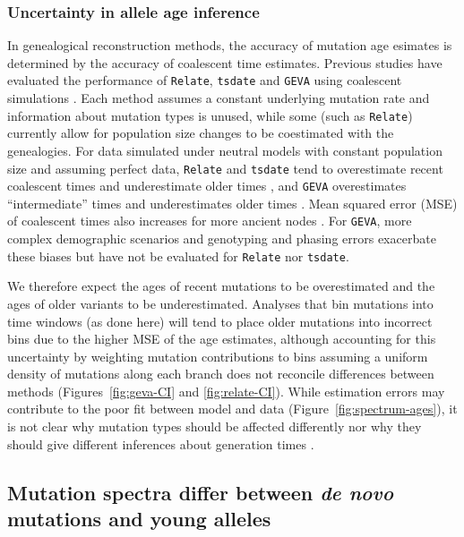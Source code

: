 \documentclass[]{article}
\newcommand{\GEVA}{\texttt{GEVA}\xspace}
\newcommand{\tsdate}{\texttt{tsdate}\xspace}
\newcommand{\relate}{\texttt{Relate}\xspace}
\begin{document}
\subsubsection*{Uncertainty in allele age inference}

In genealogical reconstruction methods, the accuracy of mutation age esimates
is determined by the accuracy of coalescent time estimates. Previous studies
have evaluated the performance of \relate, \tsdate and \GEVA using coalescent
simulations \citep{brandt2022evaluation,albers2020dating}. Each method assumes
a constant underlying mutation rate and information about mutation types is
unused, while some (such as \relate) currently allow for population size
changes to be coestimated with the genealogies. For data simulated under
neutral models with constant population size and assuming perfect data, \relate
and \tsdate tend to overestimate recent coalescent times and underestimate
older times \citep{brandt2022evaluation}, and \GEVA overestimates
``intermediate'' times and underestimates older times \citep{albers2020dating}.
Mean squared error (MSE) of coalescent times also increases for more ancient
nodes \citep{brandt2022evaluation}. For \GEVA, more complex demographic scenarios
 and genotyping and phasing errors exacerbate these biases \cite{albers2020dating}
but have not be evaluated for \relate nor \tsdate.

We therefore expect the ages of recent mutations to be overestimated and the
ages of older variants to be underestimated. Analyses that bin mutations into
time windows (as done here) will tend to place older mutations into incorrect
bins due to the higher MSE of the age estimates, although accounting for this
uncertainty by weighting mutation contributions to bins assuming a uniform
density of mutations along each branch does not reconcile differences between
methods (Figures~\ref{fig:geva-CI} and \ref{fig:relate-CI}). While estimation
errors may contribute to the poor fit between model and data
(Figure~\ref{fig:spectrum-ages}), it is not clear why mutation types should be
affected differently nor why they should give different inferences about
generation times \citep{gao2023limited}.

\subsection*{Mutation spectra differ between \emph{de novo} mutations and young
alleles}
\end{document}
